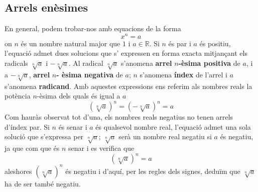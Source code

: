 \subsection{Arrels enèsimes}

En general, podem trobar-nos amb equacions de la forma%
\begin{equation*}
x^{n}=a
\end{equation*}%
on $n$ és un nombre natural major que $1$ i $a\in \mathbb{R}$. Si $%
n$ és par i $a$ és positiu, l’equació admet dues solucions que s’
expressen en forma exacta mitjançant els radicals $\sqrt[n]{a}$ i $-\sqrt[n]{a}
$. Al radical $\sqrt[n]{a}$ s’anomena \textbf{arrel }$n$\textbf{-èsima positiva} de $a$, i a $-\sqrt[n]{a}$, \textbf{arrel }$n$\textbf{-%
èsima negativa} de $a$; $n$ s’anomena \textbf{índex }de l’arrel i $a$ s’anomena \textbf{radicand}. Amb aquestes expressions ens referim als
nombres reals la potència $n$-èsima dels quals és igual a $a$%
\begin{equation*}
\left( \sqrt[n]{a}\right) ^{n}=\left( -\sqrt[n]{a}\right) ^{n}=a
\end{equation*}%
Com hauràs observat tot d’una, els nombres reals negatius no
tenen arrels d’índex par. Si $n$ és senar i $a$ és qualsevol nombre real, l’equació admet una sola solució que s’expressa
per $\sqrt[n]{a}$; $\sqrt[n]{a}$ serà un nombre real negatiu si $a$
és negatiu, ja que com que és $n$ senar i es verifica que%
\begin{equation*}
\left( \sqrt[n]{a}\right) ^{n}=a
\end{equation*}%
aleshores $\left( \sqrt[n]{a}\right) ^{n}$ és negatiu i d’aquí, per
les regles dels signes, deduïm que $\sqrt[n]{a}$ ha de ser també
negatiu.

